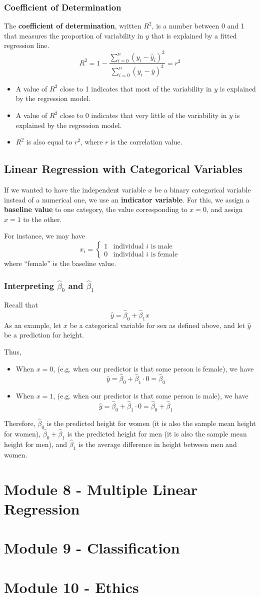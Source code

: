\documentclass[10pt]{article}
\newcommand{\spacer}[0]{\par\vspace{0.1in}}
\begin{document}
\subsubsection{Coefficient of Determination}
The \textbf{coefficient of determination}, written $R^2$, is a number between 0 and 1 that measures the proportion of variability in $y$ that is explained by a fitted regression line.
$$
    R^2=1-\frac{\displaystyle\sum_{i=0}^n (y_i-\hat y_i)^2}{\displaystyle\sum_{i=0}^n (y_i-\overline y)^2}=r^2
$$
\begin{itemize}
    \item A value of $R^2$ close to 1 indicates that most of the variability in $y$ is explained by the regression model.
    \item A value of $R^2$ close to 0 indicates that very little of the variability in $y$ is explained by the regression model.
    \item $R^2$ is also equal to $r^2$, where $r$ is the correlation value.
\end{itemize}
\subsection{Linear Regression with Categorical Variables}
If we wanted to have the independent variable $x$ be a binary categorical variable instead of a numerical one, we use an \textbf{indicator variable}. For this, we assign a \textbf{baseline value} to one category, the value corresponding to $x=0$, and assign $x=1$ to the other. \spacer
For instance, we may have
$$
    x_i=\begin{cases}1&\text{individual $i$ is male}\\0&\text{individual $i$ is female}\end{cases}
$$
where ``female'' is the baseline value.
\subsubsection{Interpreting $\hat \beta_0$ and $\hat \beta_1$}
Recall that 
$$
    \hat y = \hat \beta_0 + \hat \beta_1 x
$$
As an example, let $x$ be a categorical variable for sex as defined above, and let $\hat y$ be a prediction for height.
\spacer
Thus,
\begin{itemize}
    \item When $x=0$, (e.g. when our predictor is that some person is female), we have
    $$
        \hat y = \hat \beta_0 + \hat \beta_1 \cdot 0 = \hat \beta_0
    $$
    \item When $x=1$, (e.g. when our predictor is that some person is male), we have
    $$
        \hat y = \hat \beta_0 + \hat \beta_1 \cdot 0 = \hat \beta_0 + \hat \beta_1
    $$
\end{itemize}
Therefore, $\hat\beta_0$ is the predicted height for women (it is also the sample mean height for women), $\hat\beta_0+\hat\beta_1$ is the predicted height for men (it is also the sample mean height for men), and $\hat\beta_1$ is the average difference in height between men and women.
\section{Module 8 - Multiple Linear Regression}
\section{Module 9 - Classification}
\section{Module 10 - Ethics}
\end{document}
